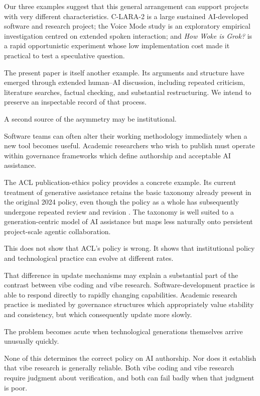 Our three examples suggest that this general arrangement can support projects with very different characteristics. C-LARA-2 is a large sustained AI-developed software and research project; the Voice Mode study is an exploratory empirical investigation centred on extended spoken interaction; and \emph{How Woke is Grok?} is a rapid opportunistic experiment whose low implementation cost made it practical to test a speculative question.

The present paper is itself another example. Its arguments and structure have emerged through extended human--AI discussion, including repeated criticism, literature searches, factual checking, and substantial restructuring. We intend to preserve an inspectable record of that process.

A second source of the asymmetry may be institutional.

Software teams can often alter their working methodology immediately when a new tool becomes useful. Academic researchers who wish to publish must operate within governance frameworks which define authorship and acceptable AI assistance.

The ACL publication-ethics policy provides a concrete example. Its current treatment of generative assistance retains the basic taxonomy already present in the original 2024 policy, even though the policy as a whole has subsequently undergone repeated review and revision \citep{acl2024policy,acl2026policy,aclresolutions2025}. The taxonomy is well suited to a generation-centric model of AI assistance but maps less naturally onto persistent project-scale agentic collaboration.

This does not show that ACL's policy is wrong. It shows that institutional policy and technological practice can evolve at different rates.

That difference in update mechanisms may explain a substantial part of the contrast between vibe coding and vibe research. Software-development practice is able to respond directly to rapidly changing capabilities. Academic research practice is mediated by governance structures which appropriately value stability and consistency, but which consequently update more slowly.

The problem becomes acute when technological generations themselves arrive unusually quickly.

None of this determines the correct policy on AI authorship. Nor does it establish that vibe research is generally reliable. Both vibe coding and vibe research require judgment about verification, and both can fail badly when that judgment is poor.

